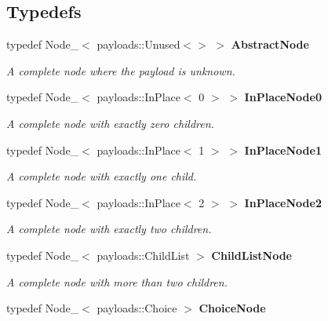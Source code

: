 \subsection*{Typedefs}
\begin{CompactItemize}
\item 
typedef Node\_\-$<$ payloads::Unused$<$$>$ $>$ {\bf Abstract\-Node}\label{namespacesprite_a26}

\begin{CompactList}\small\item\em A complete node where the payload is unknown. \item\end{CompactList}\item 
typedef Node\_\-$<$ payloads::In\-Place$<$ 0 $>$ $>$ {\bf In\-Place\-Node0}\label{namespacesprite_a27}

\begin{CompactList}\small\item\em A complete node with exactly zero children. \item\end{CompactList}\item 
typedef Node\_\-$<$ payloads::In\-Place$<$ 1 $>$ $>$ {\bf In\-Place\-Node1}\label{namespacesprite_a28}

\begin{CompactList}\small\item\em A complete node with exactly one child. \item\end{CompactList}\item 
typedef Node\_\-$<$ payloads::In\-Place$<$ 2 $>$ $>$ {\bf In\-Place\-Node2}\label{namespacesprite_a29}

\begin{CompactList}\small\item\em A complete node with exactly two children. \item\end{CompactList}\item 
typedef Node\_\-$<$ payloads::Child\-List $>$ {\bf Child\-List\-Node}\label{namespacesprite_a30}

\begin{CompactList}\small\item\em A complete node with more than two children. \item\end{CompactList}\item 
typedef Node\_\-$<$ payloads::Choice $>$ {\bf Choice\-Node}\label{namespacesprite_a31}


\end{CompactItemize}
